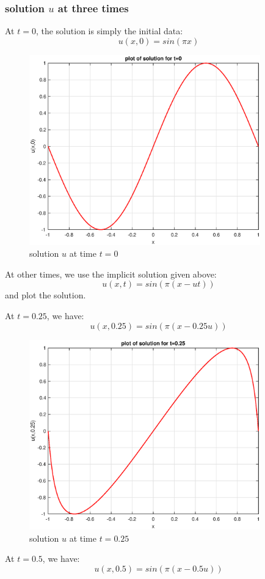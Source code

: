 \documentclass[12pt]{article} %
\newcommand{\1}[1]{\mathds{1}\left[#1\right]}
\begin{document}
\subsubsection{solution $u$ at three times}
At $t = 0$, the solution is simply the initial data:
$$
	u(x,0) = sin(\pi x)
$$
\newpage
\begin{figure}[t]
\includegraphics[width=10cm]{bur_t1.eps}
\centering
\caption{solution $u$ at time $t = 0$}
\end{figure}

At other times, we use the implicit solution given above:
$$
	u(x,t) = sin(\pi(x-ut))
$$ and plot the solution.

At $t = 0.25$, we have:
$$
	u(x,0.25) = sin(\pi(x-0.25u))
$$
\newpage 
\begin{figure}[t]
\includegraphics[width=10cm]{u_25.eps}
\centering
\caption{solution $u$ at time $t = 0.25$}
\end{figure}

At $t = 0.5$, we have:
$$
	u(x,0.5) = sin(\pi(x-0.5u))
$$
\newpage 
\end{document}
